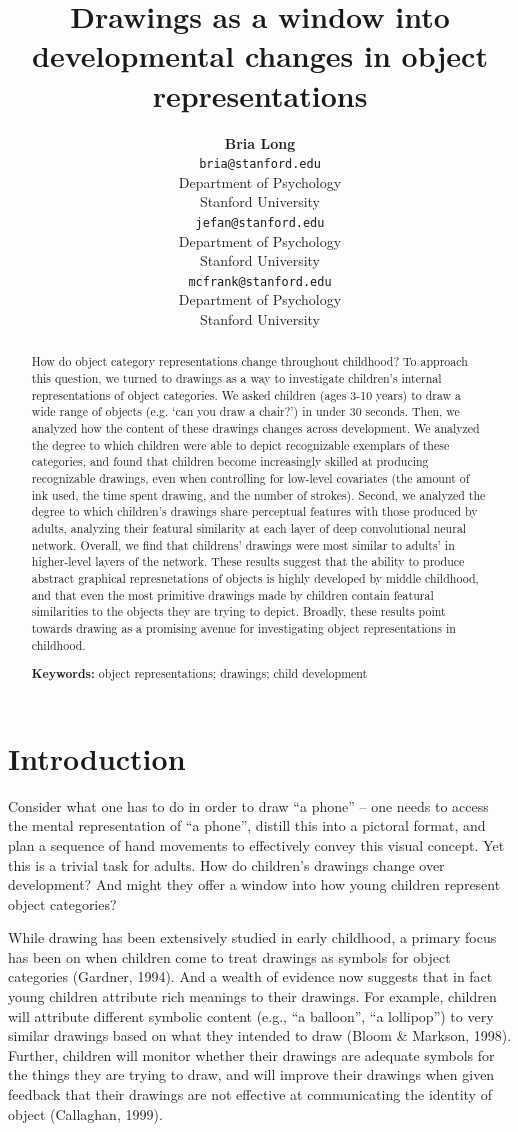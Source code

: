 \documentclass[10pt, letterpaper]{article}
\title{Drawings as a window into developmental changes in object
representations}
\author{{\large \bf Bria Long} \\ \texttt{bria@stanford.edu} \\ Department of Psychology \\ Stanford University \And {\large \bf Judith E. Fan} \\ \texttt{jefan@stanford.edu} \\ Department of Psychology \\ Stanford University \And {\large \bf Michael C. Frank } \\ \texttt{mcfrank@stanford.edu} \\ Department of Psychology \\ Stanford University}
\begin{document}
\maketitle

\begin{abstract}
How do object category representations change throughout childhood? To
approach this question, we turned to drawings as a way to investigate
children's internal representations of object categories. We asked
children (ages 3-10 years) to draw a wide range of objects (e.g. `can
you draw a chair?') in under 30 seconds. Then, we analyzed how the
content of these drawings changes across development. We analyzed the
degree to which children were able to depict recognizable exemplars of
these categories, and found that children become increasingly skilled at
producing recognizable drawings, even when controlling for low-level
covariates (the amount of ink used, the time spent drawing, and the
number of strokes). Second, we analyzed the degree to which children's
drawings share perceptual features with those produced by adults,
analyzing their featural similarity at each layer of deep convolutional
neural network. Overall, we find that childrens' drawings were most
similar to adults' in higher-level layers of the network. These results
suggest that the ability to produce abstract graphical represnetations
of objects is highly developed by middle childhood, and that even the
most primitive drawings made by children contain featural similarities
to the objects they are trying to depict. Broadly, these results point
towards drawing as a promising avenue for investigating object
representations in childhood.

\textbf{Keywords:}
object representations; drawings; child development
\end{abstract}

\section{Introduction}\label{introduction}

Consider what one has to do in order to draw ``a phone'' -- one needs to
access the mental representation of ``a phone'', distill this into a
pictoral format, and plan a sequence of hand movements to effectively
convey this visual concept. Yet this is a trivial task for adults. How
do children's drawings change over development? And might they offer a
window into how young children represent object categories?

While drawing has been extensively studied in early childhood, a primary
focus has been on when children come to treat drawings as symbols for
object categories (Gardner, 1994). And a wealth of evidence now suggests
that in fact young children attribute rich meanings to their drawings.
For example, children will attribute different symbolic content (e.g.,
``a balloon'', ``a lollipop'') to very similar drawings based on what
they intended to draw (Bloom \& Markson, 1998). Further, children will
monitor whether their drawings are adequate symbols for the things they
are trying to draw, and will improve their drawings when given feedback
that their drawings are not effective at communicating the identity of
object (Callaghan, 1999).
\end{document}
